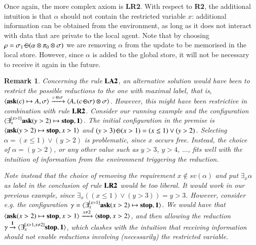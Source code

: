 \documentclass[preprint,12pt]{elsarticle}
\newtheorem{remark}{Remark}
\def\1{{\mathbf 1}}
\newcommand{\ask}{{\bf ask}}
\newcommand{\ostop}{{\bf stop}}
\def\monid{{\mathbf 0}}
\def\1{{\mathbf 1}}
\def\odiv{\, {\ominus\hspace{-7.7pt} \div} \,}
\def\monid{\mathbf{1}}
\begin{document}
Once again, the more complex axiom is {\bf LR2}. With respect to {\bf R2}, the additional intuition is that 
$\alpha$ should not contain the restricted variable $x$: additional information can be obtained from the environment,
as long as it does not interact with data that are private to the local agent.
%
Note that by choosing $\rho = \sigma_1 \odiv (\alpha \otimes \pi_0  \otimes \sigma)$ we are 
removing $\alpha$ from the update to be memorised in the local store. However, 
since $\alpha$ is added to the global store, it will not be necessary to receive it again in the future. 


\def\ooodiv{\; {\ominus\hspace{-5.7pt} \div} \;}

\begin{remark}
	Concerning the rule ${\bf LA2}$, 
	an alternative solution %
	would have been to restrict the possible reductions to the one with maximal label, 
	that is, $\langle \hbox{\ask}(c) \mapsto A, \sigma \rangle \xrightarrow{c \ooodiv \sigma} \langle A, (c \odiv \sigma) \otimes \sigma \rangle$. 
	However, this might have been restrictive in combination with rule ${\bf LR2}$.
	Consider  our running example and the configuration 
	$\langle \exists^{[x > 1]}_x \hbox{\ask}(y > 2) \mapsto \hbox{\ostop}, \monid \rangle$. The initial configuration in the premise is
	$\langle \hbox{\ask}(y > 2) \mapsto \hbox{\ostop}, x > 1 \rangle$ and $(y > 3) \odiv (x > 1) = (x \leq 1) \vee (y > 2)$.
	Selecting $\alpha = (x \leq 1) \vee (y > 2)$ is problematic, since $x$ occurs free. Instead, the choice of $\alpha = (y > 2)$,
	or any other value such as $y > 3$, $y > 4$, $\ldots$, fits well with the intuition of information  from the environment 
	triggering the reduction.
	
	Note instead that the choice of removing the requirement $x \not \in sv(\alpha)$ and put $\exists_x \alpha$ as label in the 
	conclusion of rule ${\bf LR2}$ would  be too liberal. It would work in our previous example, since 
	$\exists_x((x \leq 1) \vee (y > 3)) = y > 3$. However, consider e.g. 
	the configuration $\gamma = \langle \exists^{[x > 1]}_x \hbox{\ask}(x > 2) \mapsto \hbox{\ostop}, \monid \rangle$. 
	We would have that 
	$\langle \hbox{\ask}(x > 2) \mapsto \hbox{\ostop}, x > 1 \rangle \xrightarrow{x \neq 2} \langle \hbox{\ostop}, x > 2 \rangle$,
	and then allowing the reduction $\gamma \xrightarrow{\monid} \langle \exists^{[x > 1, x \neq 2]}_x \hbox{\ostop}, \monid \rangle$,
	which clashes with the intuition that receiving information should not enable reductions involving (necessarily) 
	the restricted variable.
\end{remark}
\end{document}
